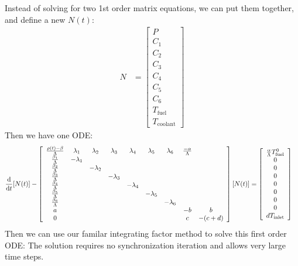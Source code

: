 \documentclass{school-22.211-notes}
\begin{document}
 
Instead of solving for two 1st order matrix equations, we can put them together, and define a new $N(t)$: 
\begin{align}
N &= \left[ \begin{array}{c} P \\ C_1 \\ C_2 \\ C_3 \\ C_4 \\ C_5 \\ C_6 \\ T_{\mathrm{fuel}} \\ T_{\mathrm{coolant}} \end{array} \right]  
\end{align}
Then we have one ODE:
\begin{align}
\frac{\mathrm{d}}{\mathrm{d}t} [N(t)] - \left[ \begin{array}{ccccccccc}
\frac{\rho(t) - \beta}{\Lambda} & \lambda_1  & \lambda_2 & \lambda_3 & \lambda_4 & \lambda_5 & \lambda_6 & \frac{-\alpha}{\Lambda} & \\ 
\frac{\beta_1}{\Lambda}         & - \lambda_1 &          &           &           &           &           & &\\
\frac{\beta_2}{\Lambda}         &             & -\lambda_2 &         &           &           &           & &\\
\frac{\beta_3}{\Lambda}         &             &            & -\lambda_3 &        &           &           & &\\
\frac{\beta_4}{\Lambda}         &             &           &          & - \lambda_4 &         &           & &\\
\frac{\beta_5}{\Lambda}         &             &           &          &           & -\lambda_5 &          & &\\
\frac{\beta_6}{\Lambda}         &             &           &          &           &           & - \lambda_6&& \\
a                               &             &           &          &           &           & & -b & b \\
0                               &             &           &          &           &           & & c & -(c+d) \\
\end{array} \right] [N(t)] 
&= 
\left[ \begin{array}{c} \frac{\alpha}{\Lambda} T_{\mathrm{fuel}}^0 \\ 0 \\ 0 \\ 0 \\ 0 \\ 0\\ 0 \\ 0 \\ d T_{\mathrm{inlet}} \end{array} \right]  
\end{align}
Then we can use our familar integrating factor method to solve this first order ODE: 
The solution requires no synchronization iteration and allows very large time steps. 
\end{document}
